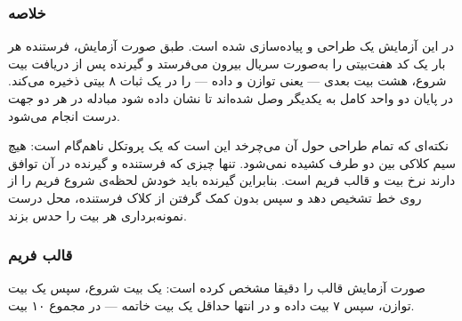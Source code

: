 \documentclass[10pt,a4paper]{article}
\begin{document}

\subsubsection*{خلاصه}

در این آزمایش یک  طراحی و پیاده‌سازی شده است. طبق صورت آزمایش، فرستنده هر بار یک کد  هفت‌بیتی را به‌صورت سریال بیرون می‌فرستد و گیرنده پس از دریافت بیت شروع، هشت بیت بعدی — یعنی توازن و داده — را در یک ثبات ۸ بیتی ذخیره می‌کند. در پایان دو واحد کامل به یکدیگر وصل شده‌اند تا نشان داده شود مبادله در هر دو جهت درست انجام می‌شود.

نکته‌ای که تمام طراحی حول آن می‌چرخد این است که  یک پروتکل {ناهم‌گام} است: هیچ سیم کلاکی بین دو طرف کشیده نمی‌شود. تنها چیزی که فرستنده و گیرنده در آن توافق دارند {نرخ بیت} و {قالب فریم} است. بنابراین گیرنده باید خودش لحظه‌ی شروع فریم را از روی خط تشخیص دهد و سپس بدون کمک گرفتن از کلاک فرستنده، محل درست نمونه‌برداری هر بیت را حدس بزند.

\subsubsection*{قالب فریم}

صورت آزمایش قالب را دقیقا مشخص کرده است: یک بیت شروع، سپس یک بیت توازن، سپس ۷ بیت داده و در انتها حداقل یک بیت خاتمه — در مجموع ۱۰ بیت.
\end{document}
